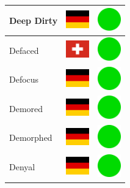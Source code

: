 \documentclass[12pt, a4paper, twoside]{report}
\begin{document}
\begin{center}
\begin{longtable}{|p{5cm}|p{2cm}|p{2cm}|}
Deep Dirty & \includegraphics[width=1cm]{4x3/de} & \includegraphics[width=1cm]{likes/y} \\ \hline
Defaced & \includegraphics[width=1cm]{4x3/ch} & \includegraphics[width=1cm]{likes/y} \\ \hline
Defocus & \includegraphics[width=1cm]{4x3/de} & \includegraphics[width=1cm]{likes/y} \\ \hline
Demored & \includegraphics[width=1cm]{4x3/de} & \includegraphics[width=1cm]{likes/y} \\ \hline
Demorphed & \includegraphics[width=1cm]{4x3/de} & \includegraphics[width=1cm]{likes/y} \\ \hline
Denyal & \includegraphics[width=1cm]{4x3/de} & \includegraphics[width=1cm]{likes/y} \\ \hline

\end{longtable}
\end{center}
\end{document}
